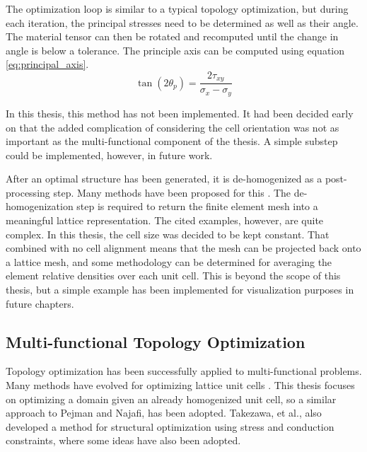 The optimization loop is similar to a typical topology optimization, but during each iteration, the principal stresses need to be determined as well as their angle. The material tensor can then be rotated and recomputed until the change in angle is below a tolerance. The principle axis can be computed using equation \ref{eq:principal_axis}.
\begin{equation}
\tan(2\theta_p) = \frac{2\tau_{xy}}{\sigma_x - \sigma_y}
\label{eq:principal_axis}
\end{equation}

In this thesis, this method has not been implemented. It had been decided early on that the added complication of considering the cell orientation was not as important as the multi-functional component of the thesis. A simple substep could be implemented, however, in future work.

After an optimal structure has been generated, it is de-homogenized as a post-processing step. Many methods have been proposed for this \cite{Groen_Sigmund_2017} \cite{Larsen_Sigmund_Groen_2018} \cite{Fernandes_Tamijani_2021}. The de-homogenization step is required to return the finite element mesh into a meaningful lattice representation. The cited examples, however, are quite complex. In this thesis, the cell size was decided to be kept constant. That combined with no cell alignment means that the mesh can be projected back onto a lattice mesh, and some methodology can be determined for averaging the element relative densities over each unit cell. This is beyond the scope of this thesis, but a simple example has been implemented for visualization purposes in future chapters.

\subsection*{Multi-functional Topology Optimization}
Topology optimization has been successfully applied to multi-functional problems. Many methods have evolved for optimizing lattice unit cells \cite{Zhang_Ye_Wei_Tao_Luo_2021} \cite{Imediegwu_Murphy_Hewson_Santer_2021} \cite{Challis_Roberts_Wilkins_2008}. This thesis focuses on optimizing a domain given an already homogenized unit cell, so a similar approach to Pejman and Najafi, \cite{Pejman_Najafi_2023} has been adopted. Takezawa, et al., \cite{Takezawa_Yoon_Jeong_Kobashi_Kitamura_2014} also developed a method for structural optimization using stress and conduction constraints, where some ideas have also been adopted.

